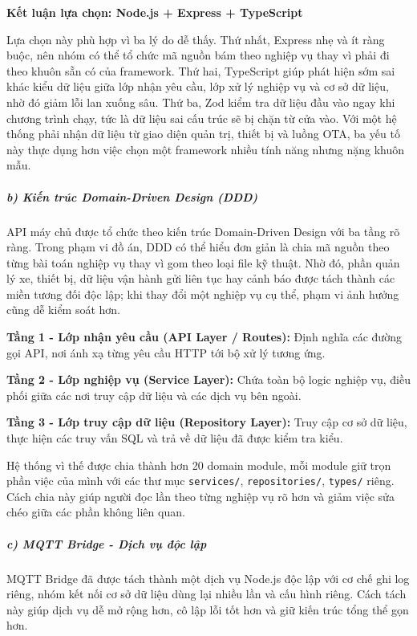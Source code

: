 \documentclass[a4paper]{extarticle}
\begin{document}
\textbf{Kết luận lựa chọn: Node.js + Express + TypeScript}

Lựa chọn này phù hợp vì ba lý do dễ thấy. Thứ nhất, Express nhẹ và ít
ràng buộc, nên nhóm có thể tổ chức mã nguồn bám theo nghiệp vụ thay vì
phải đi theo khuôn sẵn có của framework. Thứ hai, TypeScript giúp phát
hiện sớm sai khác kiểu dữ liệu giữa lớp nhận yêu cầu, lớp xử lý nghiệp
vụ và cơ sở dữ liệu, nhờ đó giảm lỗi lan xuống sâu. Thứ ba, Zod kiểm tra dữ liệu đầu vào ngay khi
chương trình chạy, tức là dữ liệu sai cấu trúc sẽ bị chặn từ cửa vào.
Với một hệ thống phải nhận dữ liệu từ giao diện quản trị, thiết bị và luồng OTA,
ba yếu tố này thực dụng hơn việc chọn một framework nhiều tính năng
nhưng nặng khuôn mẫu.

\subparagraph{b) Kiến trúc Domain-Driven Design
(DDD)}\label{b-kiux1ebfn-truxfac-domain-driven-design-ddd}

API máy chủ được tổ chức theo kiến trúc Domain-Driven Design với ba
tầng rõ ràng. Trong phạm vi đồ án, DDD có thể hiểu đơn giản là chia mã
nguồn theo từng bài toán nghiệp vụ thay vì gom theo loại file kỹ thuật.
Nhờ đó, phần quản lý xe, thiết bị, dữ liệu vận hành gửi liên tục hay
cảnh báo được tách thành các miền tương đối độc lập; khi thay đổi một
nghiệp vụ cụ thể, phạm vi ảnh hưởng cũng dễ kiểm soát hơn.

\textbf{Tầng 1 - Lớp nhận yêu cầu (API Layer / Routes):} Định nghĩa các
đường gọi API, nơi ánh xạ từng yêu cầu HTTP tới bộ xử lý tương ứng.

\textbf{Tầng 2 - Lớp nghiệp vụ (Service Layer):} Chứa toàn bộ logic
nghiệp vụ, điều phối giữa các nơi truy cập dữ liệu và các dịch vụ bên ngoài.

\textbf{Tầng 3 - Lớp truy cập dữ liệu (Repository Layer):} Truy cập cơ sở dữ
liệu, thực hiện các truy vấn SQL và trả về dữ liệu đã được kiểm tra kiểu.

Hệ thống vì thế được chia thành hơn 20 domain module, mỗi module giữ
trọn phần việc của mình với các thư mục \texttt{services/},
\texttt{repositories/}, \texttt{types/} riêng. Cách chia này giúp người
đọc lần theo từng nghiệp vụ rõ hơn và giảm việc sửa chéo giữa các phần
không liên quan.

\subparagraph{c) MQTT Bridge - Dịch vụ độc
lập}\label{c-mqtt-bridge---dux1ecbch-vux1ee5-ux111ux1ed9c-lux1eadp}

MQTT Bridge đã được tách thành một dịch vụ Node.js độc lập với cơ chế ghi
log riêng, nhóm kết nối cơ sở dữ
liệu dùng lại nhiều lần và cấu hình riêng. Cách tách này giúp dịch vụ dễ
mở rộng hơn, cô lập lỗi tốt hơn và giữ kiến trúc tổng thể gọn hơn.
\end{document}
